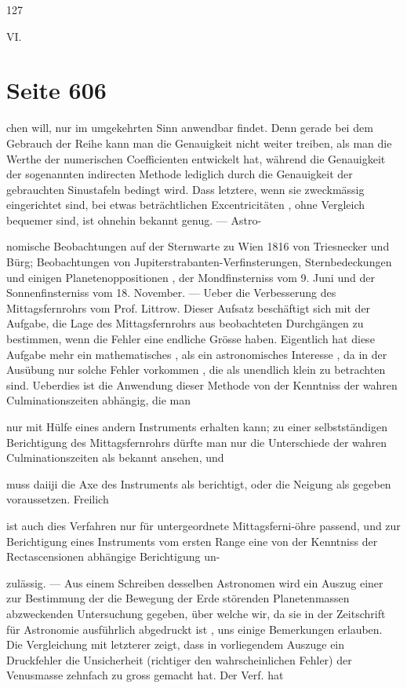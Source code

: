 \documentclass[10pt,a4paper]{article}
\begin{document}
127

VI.


\newpage
\section*{Seite 606}
chen will, nur im umgekehrten Sinn anwendbar findet. Denn gerade bei dem Gebrauch der Reihe kann man die Genauigkeit nicht weiter treiben, als man die Werthe der numerischen Coefficienten entwickelt hat, während die Genauigkeit der sogenannten indirecten Methode lediglich durch die Genauigkeit der gebrauchten Sinustafeln bedingt wird. Dass letztere, wenn sie zweckmässig eingerichtet sind, bei etwas beträchtlichen Excentricitäten , ohne Vergleich bequemer sind, ist ohnehin bekannt genug. — Astro-

nomische Beobachtungen auf der Sternwarte zu Wien 1816 von Triesnecker und Bürg; Beobachtungen von Jupiterstrabanten-Verfinsterungen, Sternbedeckungen und einigen Planetenoppositionen , der Mondfinsterniss vom 9. Juni und der Sonnenfinsterniss vom 18. November. — Ueber die Verbesserung des Mittagsfernrohrs vom Prof. Littrow. Dieser Aufsatz beschäftigt sich mit der Aufgabe, die Lage des Mittagsfernrohrs aus beobachteten Durchgängen zu bestimmen, wenn die Fehler eine endliche Grösse haben. Eigentlich hat diese Aufgabe mehr ein mathematisches , als ein astronomisches Interesse , da in der Ausübung nur solche Fehler vorkommen , die als unendlich klein zu betrachten sind. Ueberdies ist die Anwendung dieser Methode von der Kenntniss der wahren Culminationszeiten abhängig, die man

nur mit Hülfe eines andern Instruments erhalten kann; zu einer selbstständigen Berichtigung des Mittagsfernrohrs dürfte man nur die Unterschiede der wahren Culminationszeiten als bekannt ansehen, und

muss daiiji die Axe des Instruments als berichtigt, oder die Neigung als gegeben voraussetzen. Freilich

ist auch dies Verfahren nur für untergeordnete Mittagsferni-öhre passend, und zur Berichtigung eines Instruments vom ersten Range eine von der Kenntniss der Rectascensionen abhängige Berichtigung un-

zulässig. — Aus einem Schreiben desselben Astronomen wird ein Auszug einer zur Bestimmung der die Bewegung der Erde störenden Planetenmassen abzweckenden Untersuchung gegeben, über welche wir, da sie in der Zeitschrift für Astronomie ausführlich abgedruckt ist , uns einige Bemerkungen erlauben. Die Vergleichung mit letzterer zeigt, dass in vorliegendem Auszuge ein Druckfehler die Unsicherheit (richtiger den wahrscheinlichen Fehler) der Venusmasse zehnfach zu gross gemacht hat. Der Verf. hat
\end{document}
